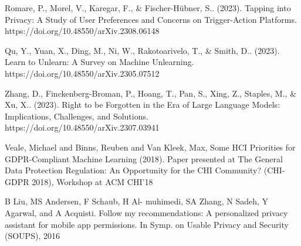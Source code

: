 \documentclass[11pt]{article}
\begin{document}
\begin{thebibliography}{9}

Romare, P., Morel, V., Karegar, F., \& Fischer-Hübner, S.. (2023). Tapping into Privacy: A Study of User Preferences and Concerns on Trigger-Action Platforms. https://doi.org/10.48550/arXiv.2308.06148

Qu, Y., Yuan, X., Ding, M., Ni, W., Rakotoarivelo, T., \& Smith, D.. (2023). Learn to Unlearn: A Survey on Machine Unlearning. https://doi.org/10.48550/arXiv.2305.07512

Zhang, D., Finckenberg-Broman, P., Hoang, T., Pan, S., Xing, Z., Staples, M., \& Xu, X.. (2023). Right to be Forgotten in the Era of Large Language Models: Implications, Challenges, and Solutions. https://doi.org/10.48550/arXiv.2307.03941

Veale, Michael and Binns, Reuben and Van Kleek, Max, Some HCI Priorities for GDPR-Compliant Machine Learning (2018). Paper presented at The General Data Protection Regulation: An Opportunity for the CHI Community? (CHI-GDPR 2018), Workshop at ACM CHI'18

B Liu, MS Andersen, F Schaub, H Al- muhimedi, SA Zhang, N Sadeh, Y Agarwal, and A Acquisti. Follow my recommendations: A personalized privacy assistant for mobile app permissions. In Symp. on Usable Privacy and Security (SOUPS), 2016

\end{thebibliography}
\end{document}
